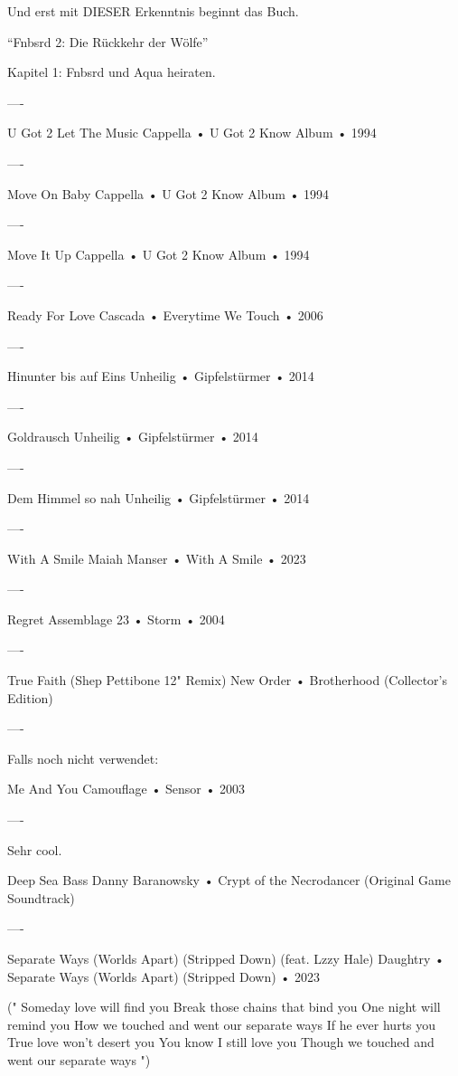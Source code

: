 Und erst mit DIESER Erkenntnis beginnt das Buch.


“Fnbsrd 2: Die Rückkehr der Wölfe”


Kapitel 1: Fnbsrd und Aqua heiraten.







----


U Got 2 Let The Music
Cappella
 •
U Got 2 Know Album
 • 1994

----

Move On Baby
Cappella
 •
U Got 2 Know Album
 • 1994

----

Move It Up
Cappella
 •
U Got 2 Know Album
 • 1994

----

Ready For Love
Cascada
 •
Everytime We Touch
 • 2006

 ----

Hinunter bis auf Eins
Unheilig
 •
Gipfelstürmer
 • 2014

----

Goldrausch
Unheilig
 •
Gipfelstürmer
 • 2014

----

Dem Himmel so nah
Unheilig
 •
Gipfelstürmer
 • 2014

----

With A Smile
Maiah Manser
 •
With A Smile
 • 2023

----

Regret
Assemblage 23
 •
Storm
 •
2004

----

True Faith (Shep Pettibone 12" Remix)
New Order
 •
Brotherhood (Collector's Edition)

----

Falls noch nicht verwendet:

Me And You
Camouflage
 •
Sensor
 •
2003

----

Sehr cool.

Deep Sea Bass
Danny Baranowsky
 •
Crypt of the Necrodancer (Original Game Soundtrack)

----

Separate Ways (Worlds Apart) (Stripped Down) (feat. Lzzy Hale)
Daughtry
 •
Separate Ways (Worlds Apart) (Stripped Down)
 •
2023

("
Someday love will find you
Break those chains that bind you
One night will remind you
How we touched and went our separate ways
If he ever hurts you
True love won't desert you
You know I still love you
Though we touched and went our separate ways
")

